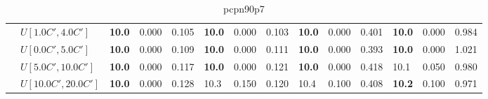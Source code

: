 \begin{table}[h]
{\begin{tabular}{|l|l||l|l|l||l|l|l||l|l|l||l|l|l|}
       & $U[1.0C',4.0C']$ & \textbf{10.0} & 0.000 & 0.105 & \textbf{10.0} & 0.000 & 0.103 & \textbf{10.0} & 0.000 & 0.401 & \textbf{10.0} & 0.000 & 0.984 \\
       & $U[0.0C',5.0C']$ & \textbf{10.0} & 0.000 & 0.109 & \textbf{10.0} & 0.000 & 0.111 & \textbf{10.0} & 0.000 & 0.393 & \textbf{10.0} & 0.000 & 1.021 \\
       & $U[5.0C',10.0C']$ & \textbf{10.0} & 0.000 & 0.117 & \textbf{10.0} & 0.000 & 0.121 & \textbf{10.0} & 0.000 & 0.418 & 10.1 & 0.050 & 0.980 \\
       & $U[10.0C',20.0C']$ & \textbf{10.0} & 0.000 & 0.128 & 10.3 & 0.150 & 0.120 & 10.4 & 0.100 & 0.408 & \textbf{10.2} & 0.100 & 0.971 \\
      \hline
      \end{tabular}
      }
      \caption{pcpn90p7}
      \label{tab:pcpn90p7}\end{table}
      
